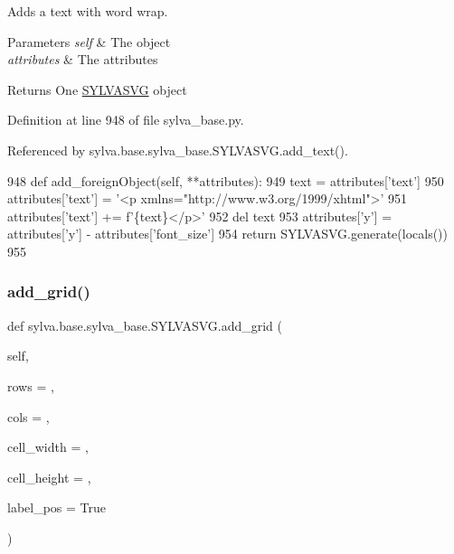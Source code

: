Adds a text with word wrap. 


\begin{DoxyParams}{Parameters}
{\em self} & The object \\
\hline
{\em attributes} & The attributes\\
\hline
\end{DoxyParams}
\begin{DoxyReturn}{Returns}
One \hyperlink{classsylva_1_1base_1_1sylva__base_1_1_s_y_l_v_a_s_v_g}{S\+Y\+L\+V\+A\+S\+VG} object 
\end{DoxyReturn}


Definition at line 948 of file sylva\+\_\+base.\+py.



Referenced by sylva.\+base.\+sylva\+\_\+base.\+S\+Y\+L\+V\+A\+S\+V\+G.\+add\+\_\+text().


\begin{DoxyCode}
948     \textcolor{keyword}{def }add\_foreignObject(self, **attributes):
949         text = attributes[\textcolor{stringliteral}{'text'}]
950         attributes[\textcolor{stringliteral}{'text'}] = \textcolor{stringliteral}{'<p xmlns="http://www.w3.org/1999/xhtml">'}
951         attributes[\textcolor{stringliteral}{'text'}] += f\textcolor{stringliteral}{'\{text\}</p>'}
952         del text
953         attributes[\textcolor{stringliteral}{'y'}] = attributes[\textcolor{stringliteral}{'y'}] - attributes[\textcolor{stringliteral}{'font\_size'}]
954         \textcolor{keywordflow}{return} SYLVASVG.generate(locals())
955 
\end{DoxyCode}
\mbox{\label{classsylva_1_1base_1_1sylva__base_1_1_s_y_l_v_a_s_v_g_ac9c126a953f3e1108e8fc4c5674b5455}} 
\subsubsection{\texorpdfstring{add\+\_\+grid()}{add\_grid()}}
{\footnotesize\ttfamily def sylva.\+base.\+sylva\+\_\+base.\+S\+Y\+L\+V\+A\+S\+V\+G.\+add\+\_\+grid (\begin{DoxyParamCaption}\item[{}]{self,  }\item[{}]{rows = {},  }\item[{}]{cols = {},  }\item[{}]{cell\+\_\+width = {},  }\item[{}]{cell\+\_\+height = {},  }\item[{}]{label\+\_\+pos = {\ttfamily True} }\end{DoxyParamCaption})}



